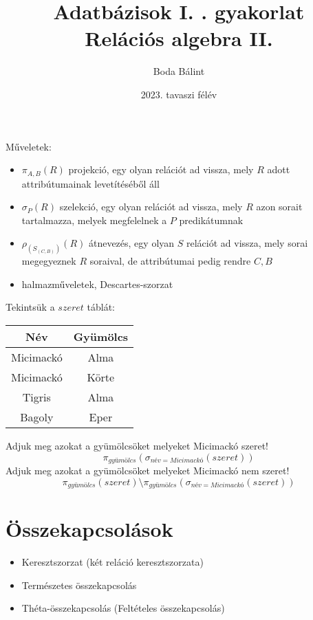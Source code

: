 \documentclass[a4paper,12pt]{article}
\title{\large{Adatbázisok I. \quad 4. gyakorlat} \\[-4pt] \huge{Relációs algebra II.} \\[-12pt]  \vspace{-15pt}}
\author{Boda Bálint}
\date{\vspace{-12pt}2023. tavaszi félév}
\theoremstyle{definition}
\begin{document}
\maketitle

Műveletek:
\begin{itemize}
	\item {
		$ \pi_{A,B}{\left( R \right) } $ projekció, egy olyan relációt ad vissza, mely $R$ adott attribútumainak levetítéséből áll
	}
	\item {
		$ \sigma_{P}{\left( R \right)} $ szelekció, egy olyan relációt ad vissza, mely $R$ azon sorait tartalmazza, melyek megfelelnek a $P$ predikátumnak
	}
	\item {
		$ \rho_{(S_{(C,B)})}{\left( R \right)} $ átnevezés, egy olyan $S$ relációt ad vissza, mely sorai megegyeznek $R$ soraival, de attribútumai pedig rendre $ C,B $
	}
	\item {
		halmazműveletek, Descartes-szorzat
	}
\end{itemize}
\noindent
Tekintsük a $ szeret $ táblát:
\begin{table}[H]
	\centering
	\begin{tabular}{|c|c|}
		\hline
		Név & Gyümölcs \\
		\hline
		Micimackó & Alma \\
		\hline
		Micimackó & Körte \\
		\hline
		Tigris & Alma \\
		\hline
		Bagoly & Eper \\
		\hline
	\end{tabular}
\end{table}
	
\noindent
Adjuk meg azokat a gyümölcsöket melyeket Micimackó szeret!
\[
\pi_{gyümölcs}{\left(  \sigma_{név = Micimackó}{\left( szeret  \right) }\right) }
\]
Adjuk meg azokat a gyümölcsöket melyeket Micimackó nem szeret!
\[
\pi_{gyümölcs}{\left( szeret \right)} \setminus \pi_{gyümölcs}{\left(  \sigma_{név = Micimackó}{\left( szeret  \right) }\right) }
\]

\section{Összekapcsolások}
\begin{itemize}
	\item Keresztszorzat (két reláció keresztszorzata)
	\item Természetes összekapcsolás
	\item Théta-összekapcsolás (Feltételes összekapcsolás)
\end{itemize}
\end{document}
